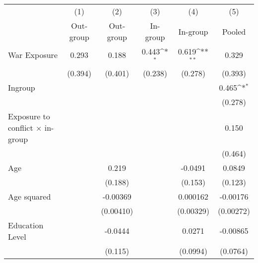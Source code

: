 {
\def\sym#1{\ifmmode^{#1}\else\(^{#1}\)\fi}
\begin{tabular}{l*{5}{c}}
\hline\hline
                    &\multicolumn{1}{c}{(1)}&\multicolumn{1}{c}{(2)}&\multicolumn{1}{c}{(3)}&\multicolumn{1}{c}{(4)}&\multicolumn{1}{c}{(5)}\\
                    &\multicolumn{1}{c}{Out-group}&\multicolumn{1}{c}{Out-group}&\multicolumn{1}{c}{In-group}&\multicolumn{1}{c}{In-group}&\multicolumn{1}{c}{Pooled}\\
\hline
War Exposure        &       0.293         &       0.188         &       0.443\sym{*}  &       0.619\sym{**} &       0.329         \\
                    &     (0.394)         &     (0.401)         &     (0.238)         &     (0.278)         &     (0.393)         \\
[1em]
Ingroup             &                     &                     &                     &                     &       0.465\sym{*}  \\
                    &                     &                     &                     &                     &     (0.278)         \\
[1em]
Exposure to conflict × in-group &                     &                     &                     &                     &       0.150         \\
                    &                     &                     &                     &                     &     (0.464)         \\
[1em]
Age                 &                     &       0.219         &                     &     -0.0491         &      0.0849         \\
                    &                     &     (0.188)         &                     &     (0.153)         &     (0.123)         \\
[1em]
Age squared         &                     &    -0.00369         &                     &    0.000162         &    -0.00176         \\
                    &                     &   (0.00410)         &                     &   (0.00329)         &   (0.00272)         \\
[1em]
Education Level     &                     &     -0.0444         &                     &      0.0271         &    -0.00865         \\
                    &                     &     (0.115)         &                     &    (0.0994)         &    (0.0764)         \\

\end{tabular}}
